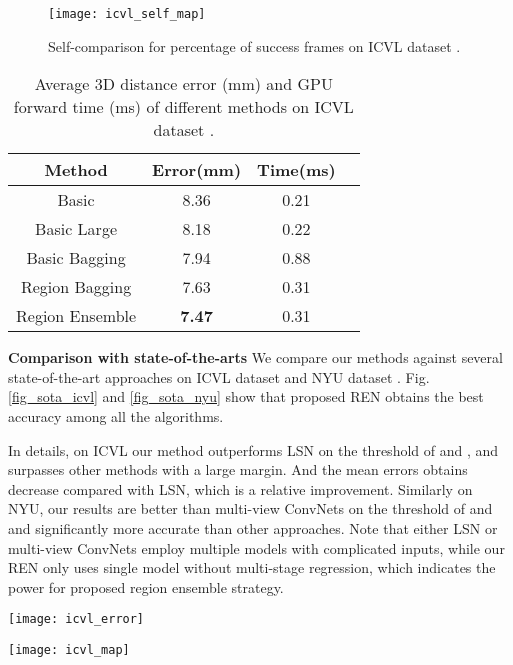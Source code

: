 \documentclass{article}
\begin{document}
\begin{figure}[htb]
\centering
{\texttt{[image: icvl\_self\_map]}}
\caption{Self-comparison for percentage of success frames on ICVL dataset \cite{tang2014latent}. }
\label{fig_self}
\end{figure}

\begin{table}[htb]
\label{table_result}
\caption{Average 3D distance error (mm) and GPU forward time (ms) of different methods on ICVL dataset \cite{tang2014latent}.}
\centering
\begin{tabular}{|c|c|c|c|}
\hline
Method & Error(mm) & Time(ms)\\
\hline
Basic & 8.36 & 0.21\\
Basic Large & 8.18 & 0.22\\
Basic Bagging & 7.94 & 0.88\\
Region Bagging & 7.63 & 0.31\\
Region Ensemble & \textbf{7.47} & 0.31 \\
\hline
\end{tabular}
\end{table}

\noindent\textbf{Comparison with state-of-the-arts}\hspace{2mm} We compare our methods against several state-of-the-art approaches on ICVL dataset \cite{tang2014latent} \cite{oberweger2015hands} \cite{sun2015cascaded} \cite{zhou2016model} \cite{wan2016hand} and NYU dataset \cite{tompson2014real} \cite{oberweger2015hands} \cite{oberwegertraining} \cite{sinha2016deephand} \cite{gerobust} \cite{zhou2016model} \cite{zhang2016learning}. Fig.\ref{fig_sota_icvl} and \ref{fig_sota_nyu} show that proposed REN obtains the best accuracy among all the algorithms.

In details, on ICVL our method outperforms LSN \cite{wan2016hand} on the threshold of  and , and surpasses other methods with a large margin. And the mean errors obtains  decrease compared with LSN, which is a  relative improvement. Similarly on NYU, our results are better than multi-view ConvNets \cite{gerobust} on the threshold of  and  and significantly more accurate than other approaches. Note that either LSN or multi-view ConvNets employ multiple models with complicated inputs, while our REN only uses single model without multi-stage regression, which indicates the power for proposed region ensemble strategy.
\begin{figure*}[htb]
\centering
\begin{minipage}[b]{0.49\textwidth}
  \centering
  \centerline{\texttt{[image: icvl\_error]}}
\end{minipage}
\begin{minipage}[b]{0.49\textwidth}
  \centering
  \centerline{\texttt{[image: icvl\_map]}}
\end{minipage}
\caption{Comparison with state-of-the-arts on ICVL \cite{tang2014latent} dataset: distance error (left) and percentage of success frames (right).}
\label{fig_sota_icvl}
\end{figure*}
\end{document}
